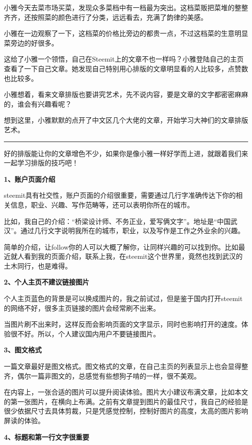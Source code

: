 \documentclass[]{ctexbook}
\begin{document}
小雅今天去菜市场买菜，发现众多菜档中有一档最为突出。这档菜贩把菜堆的整整齐齐，还按照菜的颜色进行了分类，远远看去，充满了韵律的美感。

小雅在一边观察了一下，这档菜的价格比旁边的都贵一点，不过这档菜的生意明显菜旁边的好很多。

这给了小雅一个领悟，自己在Steemit上的文章不也一样吗？小雅登陆自己的主页查看了一下自己文章。她发现自己特别用心排版的文章明显看的人比较多，点赞数也比较多。

小雅想着，看来文章排版也要讲究艺术，先不说内容，要是文章的文字都密密麻麻的，谁会有兴趣看呢？

想到这里，小雅默默的点开了中文区几个大佬的文章，开始学习大神们的文章排版艺术。

\begin{center}\rule{0.5\linewidth}{\linethickness}\end{center}

好的排版能让你的文章增色不少，如果你是像小雅一样好学而上进，就跟着我们来一起学习排版的技巧吧！

\textbf{1、账户页面介绍}

steemit具有社交性，账户页面的介绍很重要，需要通过几行字准确传达下你的相关信息，职业、兴趣、写作范畴等，还可以表明你所在的城市。

比如，我自己的介绍：``桥梁设计师、不务正业，爱写俩文字''。地址是``中国武汉''。通过几行文字说明我所在的城市，职业，以及写作是工作之外业余的兴趣。

简单的介绍，让follow你的人可以大概了解你，让同样兴趣的可以找到你。比如最近就人看到我的页面介绍，联系上我，在steemit这个世界里，竟然也找到武汉的土木同行，也是难得。

\textbf{2、个人主页不建议链接图片}

个人主页蓝色的背景是可以换成图片的，我之前试过，但是鉴于国内打开steemit的网络不好，很多主页链接的图片会经常刷不出来。

当图片刷不出来时，这样反而会影响页面的文字显示，同时也影响打开的速度。体验很不好。所以，个人建议国内用户不要链接图片。

\textbf{3、图文格式}

一篇文章最好是图文格式。图文格式的文章，在自己主页的列表显示上也会显得整齐，偶尔一篇非图文的，总感觉有些想狗子啃的一样，很不美观。

在内容上，一张合适的图片可以提升阅读体验。图片大小建议布满文章，比如本文的第一张图片，在横向上布满。之前有文章提到图片的最佳尺寸，我自己的经验是很少依据尺寸去具体剪裁，只是凭感觉控制，控制好图片的高度，太高的图片影响屏读的体验。

\textbf{4、标题和第一行文字很重要}
\end{document}

